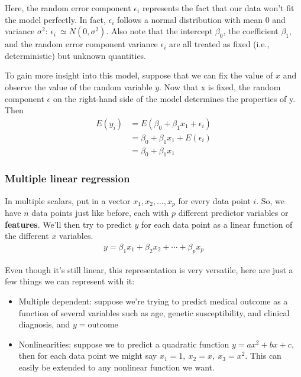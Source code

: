 \documentclass[a4paper]{article}
\numberwithin{equation}{section}
\begin{document}
Here, the random error component \(\epsilon_i\) represents the fact that our data won’t fit the model perfectly. In fact,
\(\epsilon_i\) follows a normal distribution with mean \(0\) and variance \(\sigma^2\): \(\epsilon_i\ \simeq N (0, \sigma^2)\).
Also note that the intercept \(\beta_0\), the coefficient \(\beta_1\), and the random error component variance \(\epsilon_i\) are all treated as fixed (i.e., deterministic) but unknown quantities.

To gain more insight into this model, suppose that we can fix the value of \(x\) and observe the value of the random variable \(y\).
Now that x is fixed, the random component \(\epsilon \) on the right-hand side of the model determines the properties of y.
Then
\begin{align*}
  E(y_i) & = E(\beta_0 + \beta_1x_1 + \epsilon_i) \\
         & = \beta_0 + \beta_1x_1 + E(\epsilon_i) \\
         & = \beta_0 + \beta_1x_1
\end{align*}

\newpage
\subsubsection{Multiple linear regression}
In multiple scalars, put in a vector \(x_1, x_2, \dots, x_p\) for every data point \(i\). So, we have \(n\) data points just like before, each with \(p\) different predictor variables or \textbf{features}. We'll then try to predict \(y\) for each data point as a linear function of the different \(x\) variables.
\begin{align*}
  y = \beta_1 x_1 + \beta_2 x_2 + \cdots + \beta_p x_p
\end{align*}

Even though it's still linear, this representation is very versatile, here are just a few things we can represent with it:
\begin{itemize}
  \item Multiple dependent: suppose we're trying to predict medical outcome as a function of several variables such as age, genetic susceptibility, and clinical diagnosis, and \(y = \text{outcome}\)
  \item Nonlinearities: suppose we to predict a quadratic function \(y = ax^2 + bx + c\), then for each data point we might say \(x_1 = 1,\ x_2 = x,\ x_3 = x^2\). This can easily be extended to any nonlinear function we want.
\end{itemize}
\end{document}
